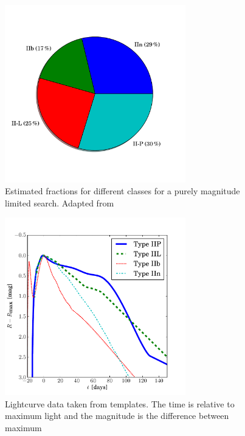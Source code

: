 \begin{figure}[htbp] %
   \centering
   \includegraphics[width=0.7\textwidth, trim=0 2.5cm 0 0cm]{chapter_intro/plots/plot_ii_fracs.pdf} 
   \caption[Fraction of different SN II classes]{Estimated fractions for different  classes for a purely magnitude limited search. Adapted from \citet{2011MNRAS.412.1441L}}
   \label{fig:ii_fracs}
\end{figure}

\begin{figure}[htbp] %
   \centering
   \includegraphics[width=0.7\textwidth]{chapter_intro/plots/plot_li11_lc_type2.pdf} 
   \caption[Lightcurve templates from \citet{2011MNRAS.412.1441L}]{Lightcurve data taken from \citet{2011MNRAS.412.1441L} templates. The time is relative to maximum light and the magnitude is the difference between maximum  }
   \label{fig:snii_lc}
\end{figure}

